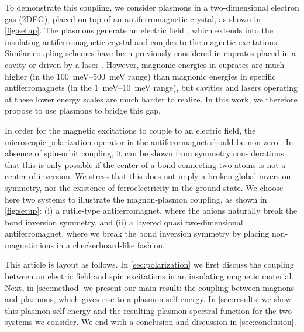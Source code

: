 \documentclass[aps,prb,reprint,twocolumns,superscriptaddress,nofootinbib]{revtex4-2}
\begin{document}
	To demonstrate this coupling, we consider plasmons in a two-dimensional electron gas (2DEG), placed on top of an antiferromagnetic crystal, as shown in \cref{fig:setup}. The plasmons generate an electric field \cite{ferreiraQuantizationGraphenePlasmons2020}, which extends into the insulating antiferromagnetic crystal and couples to the magnetic excitations. 
	Similar coupling schemes have been previously considered in cuprates placed in a cavity \cite{curtisCavityMagnonpolaritonsCuprate2022} or driven by a laser \cite{shanDynamicMagneticPhase2024}. However, magnonic energies in cuprates are much higher (in the \SIrange{100}{500}{meV} range) than magnonic energies in specific antiferromagnets (in the \SIrange{1}{10}{meV} range), but cavities and lasers operating at these lower energy scales are much harder to realize. In this work, we therefore propose to use plasmons to bridge this gap.
	
	
	In order for the magnetic excitations to couple to an electric field, the microscopic polarization operator in the antiferormagnet should be non-zero \cite{sergienkoFerroelectricityMagneticEPhase2006,bolensTheoryElectronicMagnetoelectric2018}. In absence of spin-orbit coupling, it can be shown from symmetry considerations that this is only possible if the center of a bond connecting two atoms is not a center of inversion. We stress that this does not imply a broken global inversion symmetry, nor the existence of ferroelectricity in the ground state. We choose here two systems to illustrate the magnon-plasmon coupling, as shown in \cref{fig:setup}: (i) a rutile-type antiferromagnet, where the anions naturally break the bond inversion symmetry, and (ii) a layered quasi two-dimensional antiferromagnet, where we break the bond inversion symmetry by placing non-magnetic ions in a checkerboard-like fashion.
	
	
	
	
	This article is layout as follows. In \cref{sec:polarization} we first discuss the coupling between an electric field and spin excitations in an insulating magnetic material. Next, in \cref{sec:method} we present our main result: the coupling between magnons and plasmons, which gives rise to a plasmon self-energy. In \cref{sec:results} we show this plasmon self-energy and the resulting plasmon spectral function for the two systems we consider. We end with a conclusion and discussion in \cref{sec:conclusion}.
	
	
\end{document}
